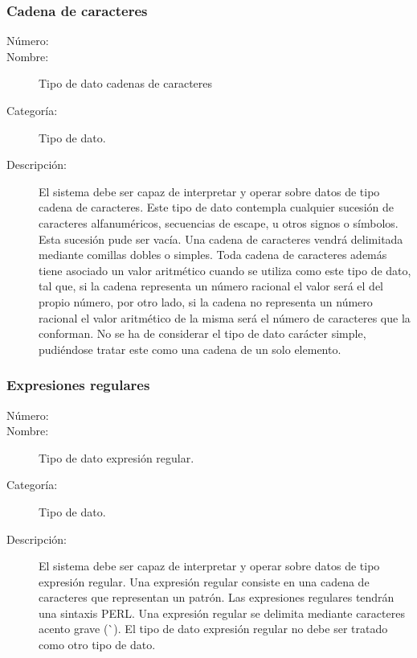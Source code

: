 \subsubsection{Cadena de caracteres}
	\begin{description}
		\item [Número:] \cn
		\item [Nombre:] Tipo de dato cadenas de caracteres
		\item [Categoría:] Tipo de dato.
		\item [Descripción:] El sistema debe ser capaz de interpretar y operar sobre datos de tipo cadena de caracteres. Este tipo
		de dato contempla cualquier sucesión de caracteres alfanuméricos, secuencias de escape, u otros signos o símbolos. Esta sucesión pude
		ser vacía. Una cadena de caracteres vendrá delimitada mediante comillas dobles o simples. Toda cadena de caracteres además tiene asociado
		un valor aritmético cuando se utiliza como este tipo de dato, tal que, si la cadena representa un número racional el valor será el del
		propio número, por otro lado, si la cadena
		no representa un número racional el valor aritmético de la misma será el número de caracteres que la conforman.  No se ha de considerar el tipo de dato carácter simple, pudiéndose tratar este como una cadena de un solo elemento.
	\end {description}

\subsubsection{Expresiones regulares}
	\begin{description}
		\item [Número:] \cn
		\item [Nombre:] Tipo de dato expresión regular.
		\item [Categoría:] Tipo de dato.
		\item [Descripción:] El sistema debe ser capaz de interpretar y operar sobre datos de tipo expresión regular. Una expresión regular
		consiste en una cadena de caracteres que representan un patrón. Las expresiones regulares tendrán una sintaxis PERL. Una expresión regular
		se delimita mediante caracteres acento grave (\`\ ). El tipo de dato expresión regular no debe ser tratado como otro tipo de dato.
	\end {description}

